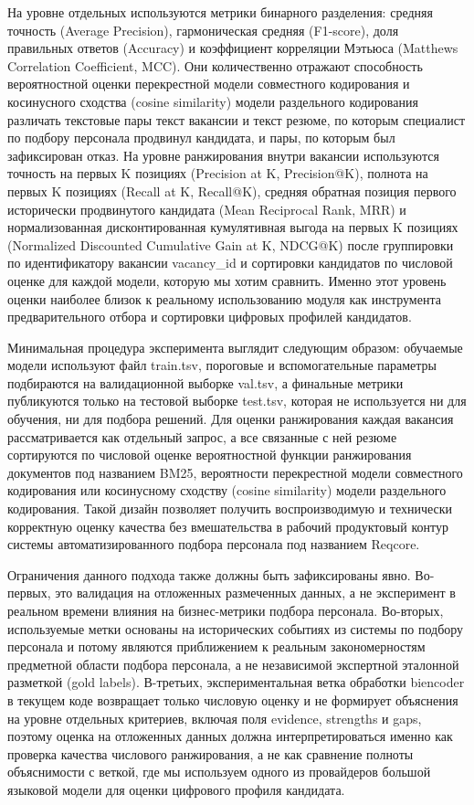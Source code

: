 На уровне отдельных используются метрики бинарного разделения: средняя точность (Average Precision), гармоническая средняя (F1-score), доля правильных ответов (Accuracy) и коэффициент корреляции Мэтьюса (Matthews Correlation Coefficient, MCC). Они количественно отражают способность вероятностной оценки перекрестной модели совместного кодирования и косинусного сходства (cosine similarity) модели раздельного кодирования различать текстовые пары текст вакансии и текст резюме, по которым специалист по подбору персонала продвинул кандидата, и пары, по которым был зафиксирован отказ. На уровне ранжирования внутри вакансии используются точность на первых K позициях (Precision at K, Precision@K), полнота на первых K позициях (Recall at K, Recall@K), средняя обратная позиция первого исторически продвинутого кандидата (Mean Reciprocal Rank, MRR) и нормализованная дисконтированная кумулятивная выгода на первых K позициях (Normalized Discounted Cumulative Gain at K, NDCG@K) после группировки по идентификатору вакансии vacancy\_id и сортировки кандидатов по числовой оценке для каждой модели, которую мы хотим сравнить. Именно этот уровень оценки наиболее близок к реальному использованию модуля как инструмента предварительного отбора и сортировки цифровых профилей кандидатов.\par
Минимальная процедура эксперимента выглядит следующим образом: обучаемые модели используют файл train.tsv, пороговые и вспомогательные параметры подбираются на валидационной выборке val.tsv, а финальные метрики публикуются только на тестовой выборке test.tsv, которая не используется ни для обучения, ни для подбора решений. Для оценки ранжирования каждая вакансия рассматривается как отдельный запрос, а все связанные с ней резюме сортируются по числовой оценке вероятностной функции ранжирования документов под названием BM25, вероятности перекрестной модели совместного кодирования или косинусному сходству (cosine similarity) модели раздельного кодирования. Такой дизайн позволяет получить воспроизводимую и технически корректную оценку качества без вмешательства в рабочий продуктовый контур системы автоматизированного подбора персонала под названием Reqcore.\par
Ограничения данного подхода также должны быть зафиксированы явно. Во-первых, это валидация на отложенных размеченных данных, а не эксперимент в реальном времени влияния на бизнес-метрики подбора персонала. Во-вторых, используемые метки основаны на исторических событиях из системы по подбору персонала и потому являются приближением к реальным закономерностям предметной области подбора персонала, а не независимой экспертной эталонной разметкой (gold labels). В-третьих, экспериментальная ветка обработки biencoder в текущем коде возвращает только числовую оценку и не формирует объяснения на уровне отдельных критериев, включая поля evidence, strengths и gaps, поэтому оценка на отложенных данных должна интерпретироваться именно как проверка качества числового ранжирования, а не как сравнение полноты объяснимости с веткой, где мы используем одного из провайдеров большой языковой модели для оценки цифрового профиля кандидата.\par

